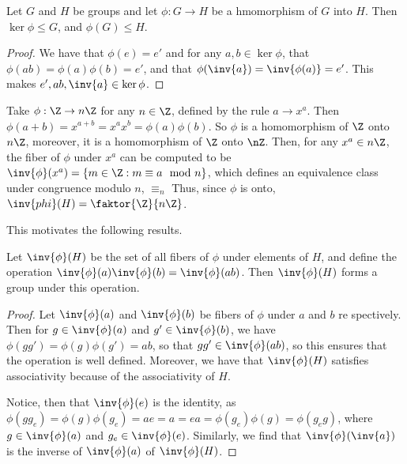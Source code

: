 \begin{lemma}\label{3.1.1}
    Let $G$ and  $H$ be groups and let  $\phi:G \rightarrow H$ be a hmomorphism
    of $G$ into  $H$. Then $\ker{\phi} \leq G$, and $\phi(G) \leq H$.
\end{lemma}
\begin{proof}
    We have that $\phi(e)=e'$ and for any $a,b \in \ker{\phi}$, that
    $\phi(ab)=\phi(a)\phi(b)=e'$, and that $\phi(\inv{a})=\inv{\phi(a)}=e'$.
    This makes $e',ab, \inv{a} \in \ker{\phi}$.
\end{proof}

\begin{example}\label{3.1}
    Take $\phi:\Z \rightarrow n\Z$ for any $n \in \Z$, defined by the rule  $a
    \rightarrow x^a$. Then $\phi(a+b)=x^{a+b}=x^ax^b=\phi(a)\phi(b)$. So $\phi$
    is a homomorphism of  $\Z$ onto $n\Z$, moreover, it is a homomorphism of
    $\Z$ onto  $\nZ$. Then, for any $x^a \in n\Z$, the fiber of $\phi$ under
    $x^a$ can be computed to be  $\inv{\phi}(x^a)=\{m \in \Z : m \equiv a
    \mod{n}\}$, which defines an equivalence class under congruence modulo $n$,
     $\equiv_n$ Thus, since $\phi$ is onto, $\inv{phi}(H)=\faktor{\Z}{n\Z}$.
\end{example}

This motivates the following results.

\begin{theorem}\label{3.1.2}
    Let $\inv{\phi}(H)$ be the set of all fibers of $\phi$ under elements of
    $H$, and define the operation $\inv{\phi}(a)\inv{\phi}(b)=\inv{\phi}(ab)$.
    Then $\inv{\phi}(H)$ forms a group under this operation.
\end{theorem}
\begin{proof}
    Let $\inv{\phi}(a)$ and $\inv{\phi}(b)$ be fibers of  $\phi$ under  $a$ and
     $b$ re spectively. Then for $g \in \inv{\phi}(a)$ and  $g' \in
     \inv{\phi}(b)$, we have  $\phi(gg')=\phi(g)\phi(g')=ab$, so that $gg' \in
     \inv{\phi}(ab)$, so this ensures that the operation is well defined.
     Moreover, we have that $\inv{\phi}(H)$ satisfies associativity because of
     the associativity of  $H$.

     Notice, then that  $\inv{\phi}(e)$ is the identity, as
     $\phi(gg_e)=\phi(g)\phi(g_e)=ae=a=ea=\phi(g_e)\phi(g)=\phi(g_eg)$, where $g
     \in \inv{\phi}(a)$ and $g_e \in \inv{\phi}(e)$. Similarly, we find that
     $\inv{\phi}(\inv{a})$ is the inverse of $\inv{\phi}(a)$ of $\inv{\phi}(H)$.
\end{proof}

